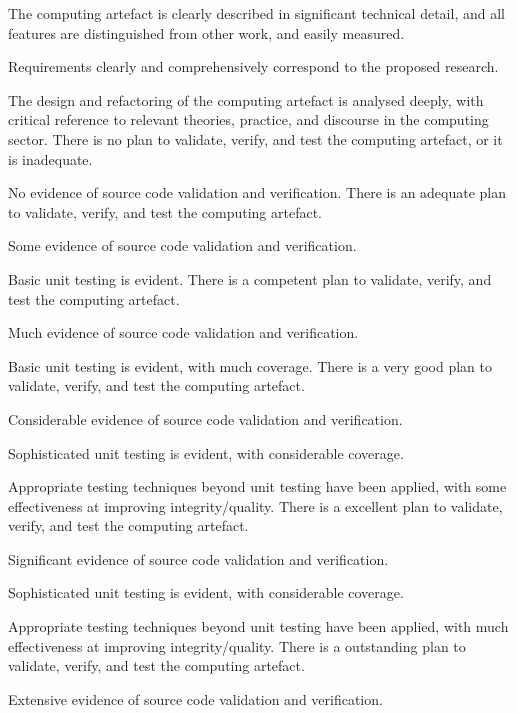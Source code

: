 \begin{markingrubric}
        \grade The computing artefact is clearly described in significant technical detail, and all features are distinguished from other work, and easily measured.
            \par Requirements clearly and comprehensively correspond to the proposed research.
            \par The design and refactoring of the computing artefact is analysed deeply, with critical reference to relevant theories, practice, and discourse in the computing sector.
%
        \grade \fail There is no plan to validate, verify, and test the computing artefact, or it is inadequate.
            \par No evidence of source code validation and verification.
        \grade There is an adequate plan to validate, verify, and test the computing artefact.
            \par Some evidence of source code validation and verification.
            \par Basic unit testing is evident.       
        \grade There is a competent plan to validate, verify, and test the computing artefact.
            \par Much evidence of source code validation and verification.
            \par Basic unit testing is evident, with much coverage.
        \grade There is a very good plan to validate, verify, and test the computing artefact.
            \par Considerable evidence of source code validation and verification.
            \par Sophisticated unit testing is evident, with considerable coverage.
            \par Appropriate testing techniques beyond unit testing have been applied, with some effectiveness at improving integrity/quality.
        \grade There is a excellent plan to validate, verify, and test the computing artefact.
            \par Significant evidence of source code validation and verification.
            \par Sophisticated unit testing is evident, with considerable coverage.
            \par Appropriate testing techniques beyond unit testing have been applied, with much effectiveness at improving integrity/quality.
        \grade There is a outstanding plan to validate, verify, and test the computing artefact. 
            \par Extensive evidence of source code validation and verification.

\end{markingrubric}
